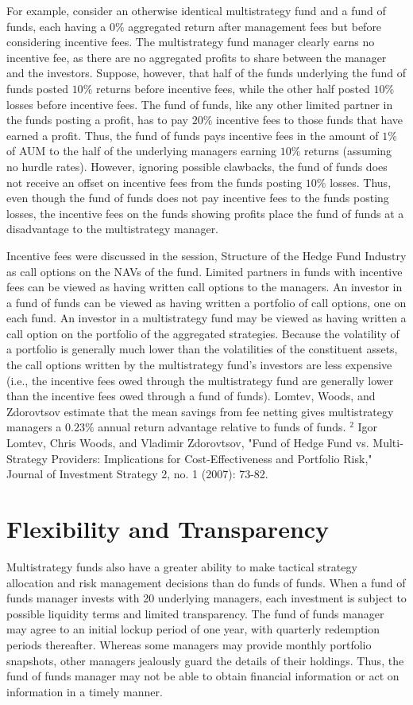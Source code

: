\documentclass[11pt]{article}
\begin{document}
For example, consider an otherwise identical multistrategy fund and a fund of funds, each having a $0 \%$ aggregated return after management fees but before considering incentive fees. The multistrategy fund manager clearly earns no incentive fee, as there are no aggregated profits to share between the manager and the investors. Suppose, however, that half of the funds underlying the fund of funds posted $10 \%$ returns before incentive fees, while the other half posted $10 \%$ losses before incentive fees. The fund of funds, like any other limited partner in the funds posting a profit, has to pay $20 \%$ incentive fees to those funds that have earned a profit. Thus, the fund of funds pays incentive fees in the amount of $1 \%$ of AUM to the half of the underlying managers earning $10 \%$ returns (assuming no hurdle rates). However, ignoring possible clawbacks, the fund of funds does not receive an offset on incentive fees from the funds posting $10 \%$ losses. Thus, even though the fund of funds does not pay incentive fees to the funds posting losses, the incentive fees on the funds showing profits place the fund of funds at a disadvantage to the multistrategy manager.

Incentive fees were discussed in the session, Structure of the Hedge Fund Industry as call options on the NAVs of the fund. Limited partners in funds with incentive fees can be viewed as having written call options to the managers. An investor in a fund of funds can be viewed as having written a portfolio of call options, one on each fund. An investor in a multistrategy fund may be viewed as having written a call option on the portfolio of the aggregated strategies. Because the volatility of a portfolio is generally much lower than the volatilities of the constituent assets, the call options written by the multistrategy fund's investors are less expensive (i.e., the incentive fees owed through the multistrategy fund are generally lower than the incentive fees owed through a fund of funds). Lomtev, Woods, and Zdorovtsov estimate that the mean savings from fee netting gives multistrategy managers a $0.23 \%$ annual return advantage relative to funds of funds. ${ }^{2}$ Igor Lomtev, Chris Woods, and Vladimir Zdorovtsov, "Fund of Hedge Fund vs. Multi-Strategy Providers: Implications for Cost-Effectiveness and Portfolio Risk," Journal of Investment Strategy 2, no. 1 (2007): 73-82.

\section*{Flexibility and Transparency}
Multistrategy funds also have a greater ability to make tactical strategy allocation and risk management decisions than do funds of funds. When a fund of funds manager invests with 20 underlying managers, each investment is subject to possible liquidity terms and limited transparency. The fund of funds manager may agree to an initial lockup period of one year, with quarterly redemption periods thereafter. Whereas some managers may provide monthly portfolio snapshots, other managers jealously guard the details of their holdings. Thus, the fund of funds manager may not be able to obtain financial information or act on information in a timely manner.
\end{document}
